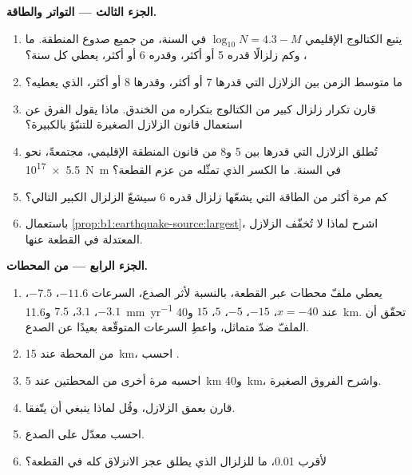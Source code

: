 \begin{problem}
\medskip
\noindent\textbf{الجزء الثالث --- التواتر والطاقة.}
\begin{enumerate}[resume]
  \item يتبع الكتالوج الإقليمي $\log_{10} N = 4.3 - M$ في السنة، من جميع صدوع المنطقة. ما ، وكم زلزالًا قدره 5 أو أكثر، وقدره 6 أو أكثر، يعطي كل سنة؟
  \item ما متوسط الزمن بين الزلازل التي قدرها 7 أو أكثر، وقدرها 8 أو أكثر، الذي يعطيه؟
  \item قارن تكرار زلزال كبير من الكتالوج بتكراره من الخندق. ماذا يقول الفرق عن استعمال قانون الزلازل الصغيرة للتنبّؤ بالكبيرة؟
  \item تُطلق الزلازل التي قدرها بين 5 و\num{8} من قانون المنطقة الإقليمي، مجتمعةً، نحو \qty{5.5e17}{N.m} في السنة. ما الكسر الذي تمثّله من عزم القطعة؟
  \item كم مرة أكثر من الطاقة التي يشعّها زلزال قدره 6 سيشعّ الزلزال الكبير التالي؟
  \item باستعمال \cref{prop:b1:earthquake-source:largest}، اشرح لماذا لا تُخفّف الزلازل المعتدلة في القطعة عنها.
\end{enumerate}

\medskip
\noindent\textbf{الجزء الرابع ---  من المحطات.}
\begin{enumerate}[resume]
  \item يعطي ملفّ محطات عبر القطعة، بالنسبة لأثر الصدع، السرعات $-11.6$، $-7.5$، $-3.1$، $3.1$، $7.5$ و\qty{11.6}{mm.yr^{-1}} عند $x = -40$، $-15$، $-5$، $5$، $15$ و\qty{40}{km}. تحقّق أن الملفّ ضدّ متماثل، واعطِ السرعات المتوقّعة بعيدًا عن الصدع.
  \item من المحطة عند \qty{15}{km}، احسب .
  \item احسبه مرة أخرى من المحطتين عند \qty{5}{km} و\qty{40}{km}، واشرح الفروق الصغيرة.
  \item قارن  بعمق الزلازل، وقُل لماذا ينبغي أن يتّفقا.
  \item احسب معدّل  على الصدع.
  \item لأقرب 0.01، ما  للزلزال الذي يطلق عجز الانزلاق كله في القطعة؟
\end{enumerate}
\end{problem}
